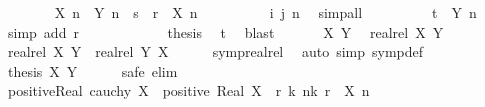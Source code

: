 \begin{isabellebody}
\ \ \ \ \ \ \isamarkupfalse%
\ {\isachardoublequoteopen}{\isasymbar}X\ n\ {\isacharminus}{\kern0pt}\ Y\ n{\isasymbar}\ {\isacharless}{\kern0pt}\ s{\isachardoublequoteclose}\ \ {\isachardoublequoteopen}r\ {\isacharless}{\kern0pt}\ X\ n{\isachardoublequoteclose}\isanewline
\ \ \ \ \ \ \ \ \isamarkupfalse%
\ i\ j\ n\ \isamarkupfalse%
\ simp{\isacharunderscore}{\kern0pt}all\isanewline
\ \ \ \ \ \ \isamarkupfalse%
\ \isamarkupfalse%
\ {\isachardoublequoteopen}t\ {\isacharless}{\kern0pt}\ Y\ n{\isachardoublequoteclose}\ \isamarkupfalse%
\ {\isacharparenleft}{\kern0pt}simp\ add{\isacharcolon}{\kern0pt}\ r{\isacharparenright}{\kern0pt}\isanewline
\ \ \ \ \isamarkupfalse%
\isanewline
\ \ \ \ \isamarkupfalse%
\ \isamarkupfalse%
\ {\isacharquery}{\kern0pt}thesis\ \isamarkupfalse%
\ t\ \isamarkupfalse%
\ blast\isanewline
\ \ \isamarkupfalse%
\isanewline
\ \ \isamarkupfalse%
\ X\ Y\ \isamarkupfalse%
\ {\isachardoublequoteopen}realrel\ X\ Y{\isachardoublequoteclose}\isanewline
\ \ \isamarkupfalse%
\ \isamarkupfalse%
\ {\isachardoublequoteopen}realrel\ X\ Y{\isachardoublequoteclose}\ \ {\isachardoublequoteopen}realrel\ Y\ X{\isachardoublequoteclose}\isanewline
\ \ \ \ \isamarkupfalse%
\ symp{\isacharunderscore}{\kern0pt}realrel\ \isamarkupfalse%
\ {\isacharparenleft}{\kern0pt}auto\ simp{\isacharcolon}{\kern0pt}\ symp{\isacharunderscore}{\kern0pt}def{\isacharparenright}{\kern0pt}\isanewline
\ \ \isamarkupfalse%
\ \isamarkupfalse%
\ {\isachardoublequoteopen}{\isacharquery}{\kern0pt}thesis\ X\ Y{\isachardoublequoteclose}\isanewline
\ \ \ \ \isamarkupfalse%
\ {\isacharparenleft}{\kern0pt}safe\ elim{\isacharbang}{\kern0pt}{\isacharcolon}{\kern0pt}\ {}{\isacharparenright}{\kern0pt}\isanewline
{}\isamarkupfalse%
%
\endisatagproof
{\isafoldproof}%
%
\isadelimproof
\isanewline
%
\endisadelimproof
\isanewline
{}\isamarkupfalse%
\ positive{\isacharunderscore}{\kern0pt}Real{\isacharcolon}{\kern0pt}\ {\isachardoublequoteopen}cauchy\ X\ {\isasymLongrightarrow}\ positive\ {\isacharparenleft}{\kern0pt}Real\ X{\isacharparenright}{\kern0pt}\ {\isasymlongleftrightarrow}\ {\isacharparenleft}{\kern0pt}{\isasymexists}r{\isachargreater}{\kern0pt}{}{\isachardot}{\kern0pt}\ {\isasymexists}k{\isachardot}{\kern0pt}\ {\isasymforall}n{\isasymge}k{\isachardot}{\kern0pt}\ r\ {\isacharless}{\kern0pt}\ X\ n{\isacharparenright}{\kern0pt}{\isachardoublequoteclose}\isanewline

\end{isabellebody}
